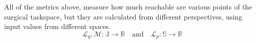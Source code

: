 All of the metrics above, measure how much reachable are various points of the surgical taskspace, but they are calculated from different perspectives, using input values from different spaces.
\begin{equation}
\mathcal{L}_{q}, \mathcal{M}: \mathbb{J} \longrightarrow \mathbb{R} \quad \textrm{and} \quad
\mathcal{L}_{p}: \mathbb{S} \longrightarrow \mathbb{R}
\end{equation}